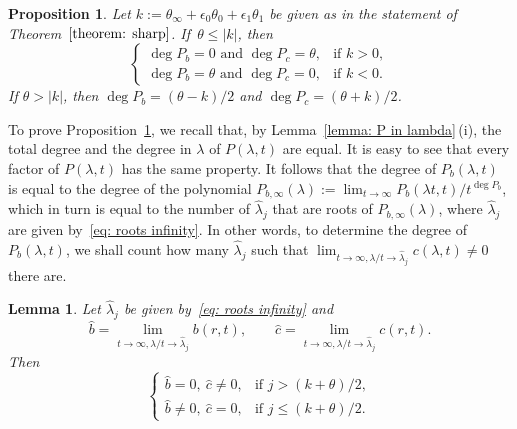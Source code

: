 \documentclass[10pt,a4paper]{amsart}
\numberwithin{equation}{section}
\newtheorem{Lemma}[Theorem]{Lemma}
\newtheorem{Proposition}[Theorem]{Proposition}
\begin{document}
\begin{Proposition} \label{prop: degree of Pb}
 Let $k:=\theta_\infty+\epsilon_0\theta_0+\epsilon_1\theta_1$ be
 given as in the statement of Theorem~$\ref{theorem: sharp}$.
 If~$\theta\le|k|$, then
\[
 \begin{cases}
 \deg P_b=0\text{ and }\deg P_c=\theta, &\text{if }k>0, \\
 \deg P_b=\theta\text{ and }\deg P_c=0, &\text{if }k<0.
 \end{cases}
\]
 If $\theta>|k|$, then $\deg P_b=(\theta-k)/2$ and $\deg
 P_c=(\theta+k)/2$.
\end{Proposition}

To prove Proposition~\ref{prop: degree of Pb}, we recall that, by
Lemma~\ref{lemma: P in lambda}\,(i), the total degree and the degree in
$\lambda$ of $P(\lambda,t)$ are equal. It is easy to see that every
factor of $P(\lambda,t)$ has the same property. It follows that the
degree of $P_b(\lambda,t)$ is equal to the degree of the polynomial
$P_{b,\infty}(\lambda):=\lim_{t\to\infty}P_b(\lambda t,t)/t^{\deg
 P_b}$, which in turn is equal to the number of $\hat\lambda_j$ that
are roots of $P_{b,\infty}(\lambda)$, where $\hat\lambda_j$ are given
by~\eqref{eq: roots infinity}. In other words, to determine the degree
of $P_b(\lambda,t)$, we shall count how many $\hat\lambda_j$ such that
$\lim_{t\to\infty,\lambda/t\to\hat\lambda_j}c(\lambda,t)\neq 0$ there
are.

\begin{Lemma}\label{lem-111} Let $\hat\lambda_j$ be given by~\eqref{eq: roots
 infinity} and
\[
 \hat b=\lim_{t\to\infty,\lambda/t\to\hat\lambda_j}b(r,t), \qquad
 \hat c=\lim_{t\to\infty,\lambda/t\to\hat\lambda_j}c(r,t).
\]
 Then
\[
 \begin{cases}
 \hat b=0,~\hat c\neq 0, & \text{if }j>(k+\theta)/2, \\
 \hat b\neq0,~\hat c=0, &\text{if }j\le(k+\theta)/2.
 \end{cases}
\]
\end{Lemma}
\end{document}
